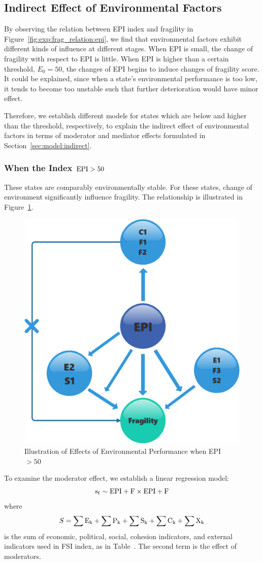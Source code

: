 \subsection{Indirect Effect of Environmental Factors}
\label{sec:exp:indirect}
By observing the relation between EPI index and fragility in Figure~\ref{fig:exp:frag_relation:epi}, we find that environmental factors exhibit different kinds of influence at different stages. 
When EPI is small, the change of fragility with respect to EPI is little. When EPI is higher than a certain threshold, $E_0=50$, the changes of EPI begins to induce changes of fragility score. It could be explained, since when a state's environmental performance is too low, it tends to become too unstable such that further deterioration would have minor effect.  

Therefore, we establish different models for states which are below and higher than the threshold, respectively, to explain the indirect effect of environmental factors in terms of moderator and mediator effects formulated in Section~\ref{sec:model:indirect}.

\subsubsection{When the Index $\rm{EPI} > 50$}
These states are comparably environmentally stable. For these states, change of environment significantly influence fragility. The relationship is illustrated in Figure~\ref{fig:exp:indirect:case2}.
\begin{figure}[tbp]
    \centering
   \includegraphics[width=.4\linewidth]{figs/larger50.eps} 
   \caption{Illustration of Effects of Environmental Performance when EPI $> 50$}
   \label{fig:exp:indirect:case2}
\end{figure}

To examine the moderator effect, we establish a linear regression model:
\begin{equation}
    \operatorname*{s_f} \sim \rm{EPI} + F \times\rm{EPI}+ F
    \label{eqn:indirect:moderator:reg} 
\end{equation}
where
\begin{equation}
   S= \sum\rm{E}_k + \sum\rm{P}_k + \sum\rm{S}_k + \sum\rm{C}_k + \sum\rm{X}_k
\end{equation}
is the sum of economic, political, social, cohesion indicators, and external indicators used in FSI index, as in Table~\cite{FSI_index}. 
The second term is the effect of moderators. 

